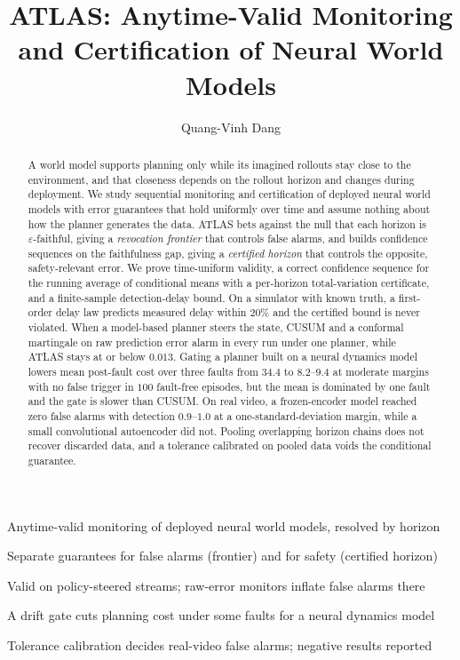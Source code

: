 \documentclass[preprint,12pt,authoryear]{elsarticle}
\theoremstyle{plain}
\theoremstyle{definition}
\begin{document}
\begin{frontmatter}

\title{ATLAS: Anytime-Valid Monitoring and Certification of Neural World Models}

\author[buv]{Quang-Vinh Dang}

\begin{abstract}
A world model supports planning only while its imagined rollouts stay close to the environment, and that closeness depends on the rollout horizon and changes during deployment. We study sequential monitoring and certification of deployed neural world models with error guarantees that hold uniformly over time and assume nothing about how the planner generates the data. ATLAS bets against the null that each horizon is $\varepsilon$-faithful, giving a \emph{revocation frontier} that controls false alarms, and builds confidence sequences on the faithfulness gap, giving a \emph{certified horizon} that controls the opposite, safety-relevant error. We prove time-uniform validity, a correct confidence sequence for the running average of conditional means with a per-horizon total-variation certificate, and a finite-sample detection-delay bound. On a simulator with known truth, a first-order delay law predicts measured delay within $20\%$ and the certified bound is never violated. When a model-based planner steers the state, CUSUM and a conformal martingale on raw prediction error alarm in every run under one planner, while ATLAS stays at or below $0.013$. Gating a planner built on a neural dynamics model lowers mean post-fault cost over three faults from $34.4$ to $8.2$--$9.4$ at moderate margins with no false trigger in $100$ fault-free episodes, but the mean is dominated by one fault and the gate is slower than CUSUM. On real video, a frozen-encoder model reached zero false alarms with detection $0.9$--$1.0$ at a one-standard-deviation margin, while a small convolutional autoencoder did not. Pooling overlapping horizon chains does not recover discarded data, and a tolerance calibrated on pooled data voids the conditional guarantee.
\end{abstract}

\begin{highlights}
\item Anytime-valid monitoring of deployed neural world models, resolved by horizon
\item Separate guarantees for false alarms (frontier) and for safety (certified horizon)
\item Valid on policy-steered streams; raw-error monitors inflate false alarms there
\item A drift gate cuts planning cost under some faults for a neural dynamics model
\item Tolerance calibration decides real-video false alarms; negative results reported
\end{highlights}


\end{frontmatter}
\end{document}
